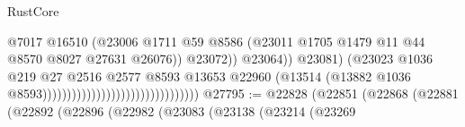 \begin{lexlean}{RustCore}
\begin{coremodule}
                                                                        @7017
                                                                        @16510
                                                                        (@23006
                                                                          @1711
                                                                          @59
                                                                          @8586
                                                                          (@23011
                                                                            @1705
                                                                            @1479
                                                                            @11
                                                                            @44
                                                                            @8570
                                                                            @8027
                                                                            @27631
                                                                            @26076))
                                                                        @23072))
                                                                    @23064))
                                                                @23081)
                                                              (@23023
                                                                @1036
                                                                @219
                                                                @27
                                                                @2516
                                                                @2577
                                                                @8593
                                                                @13653
                                                                @22960
                                                                (@13514
                                                                  (@13882
                                                                    @1036
                                                                    @8593))))))))))))))))))))))))))))))))
@27795 := @22828
    (@22851
      (@22868
        (@22881
          (@22892
            (@22896
              (@22982
                (@23083
                  (@23138
                    (@23214
                      (@23269

\end{coremodule}
\end{lexlean}
